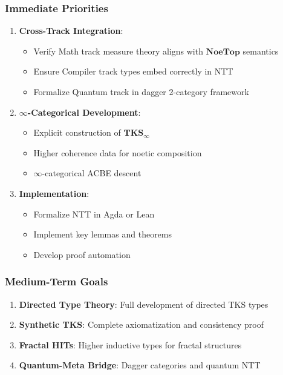 \subsubsection{Immediate Priorities}
\begin{enumerate}
  \item \textbf{Cross-Track Integration}:
    \begin{itemize}
      \item Verify Math track measure theory aligns with $\mathbf{NoeTop}$ semantics
      \item Ensure Compiler track types embed correctly in NTT
      \item Formalize Quantum track in dagger 2-category framework
    \end{itemize}

  \item \textbf{$\infty$-Categorical Development}:
    \begin{itemize}
      \item Explicit construction of $\mathbf{TKS}_\infty$
      \item Higher coherence data for noetic composition
      \item $\infty$-categorical ACBE descent
    \end{itemize}

  \item \textbf{Implementation}:
    \begin{itemize}
      \item Formalize NTT in Agda or Lean
      \item Implement key lemmas and theorems
      \item Develop proof automation
    \end{itemize}
\end{enumerate}

\subsubsection{Medium-Term Goals}
\begin{enumerate}
  \item \textbf{Directed Type Theory}: Full development of directed TKS types
  \item \textbf{Synthetic TKS}: Complete axiomatization and consistency proof
  \item \textbf{Fractal HITs}: Higher inductive types for fractal structures
  \item \textbf{Quantum-Meta Bridge}: Dagger categories and quantum NTT
\end{enumerate}

